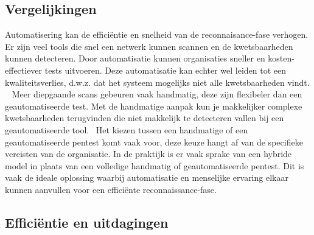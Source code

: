 \subsection{Vergelijkingen}

Automatisering kan de efficiëntie en snelheid van de reconnaisance-fase verhogen. Er zijn veel tools die snel een netwerk kunnen scannen 
en de kwetsbaarheden kunnen detecteren. Door automatisatie kunnen 
organisaties sneller en kosten-effectiever tests uitvoeren. Deze automatisatie kan echter wel leiden tot een kwaliteitsverlies, 
d.w.z. dat het systeem mogelijks niet alle kwetsbaarheden vindt. ~\autocite{peris}
Meer diepgaande scans gebeuren vaak handmatig, deze zijn flexibeler dan een geautomatiseerde test. 
Met de handmatige aanpak kun je makkelijker complexe kwetsbaarheden terugvinden die niet makkelijk te detecteren vallen bij 
een geautomatiseerde tool.~\autocite{techtarget} 
Het kiezen tussen een handmatige of een geautomatiseerde pentest komt vaak voor, deze keuze hangt af van de specifieke  
vereisten van de organisatie. In de praktijk is er vaak sprake van een hybride model in plaats van een volledige handmatig of geautomatiseerde pentest.
Dit is vaak de ideale oplossing waarbij automatisatie en menselijke ervaring elkaar kunnen 
aanvullen voor een efficiënte reconnaissance-fase. ~\autocite{techtarget}

\subsection{Efficiëntie en uitdagingen}


